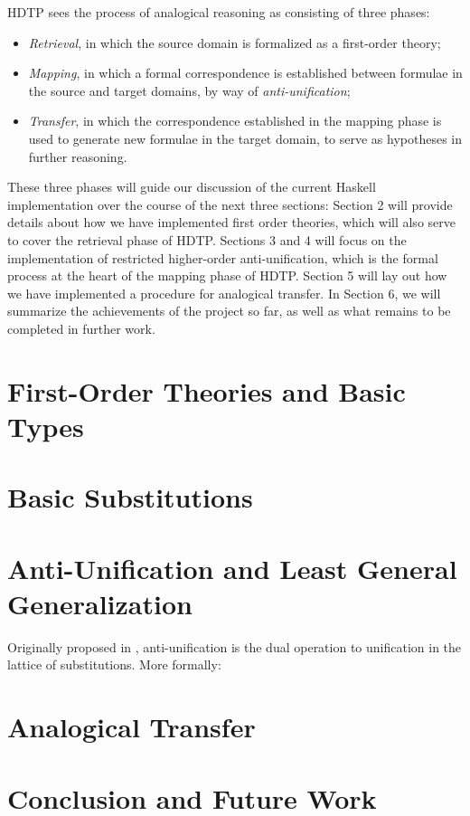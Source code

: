 \documentclass[12pt,a4paper]{article}
\begin{document}
HDTP sees the process of analogical reasoning as consisting of three phases: 
\begin{itemize}
    \item \textit{Retrieval}, in which the source domain is formalized as a first-order theory;
    \item \textit{Mapping}, in which a formal correspondence is established between formulae in the source and target domains, by way of \textit{anti-unification};
    \item \textit{Transfer}, in which the correspondence established in the mapping phase is used to generate new formulae in the target domain, to serve as hypotheses in further reasoning.
\end{itemize} 

These three phases will guide our discussion of the current Haskell implementation over the course of the next three sections: Section 2 will provide details about how we have implemented first order theories, which will also serve to cover the retrieval phase of HDTP. Sections 3 and 4 will focus on the implementation of restricted higher-order anti-unification, which is the formal process at the heart of the mapping phase of HDTP. Section 5 will lay out how we have implemented a procedure for analogical transfer. In Section 6, we will summarize the achievements of the project so far, as well as what remains to be completed in further work.
% 

\section{First-Order Theories and Basic Types}

% 

\section{Basic Substitutions}

% 

\section{Anti-Unification and Least General Generalization}
Originally proposed in \cite{Plotkin70}, anti-unification is the dual operation to unification in the lattice of substitutions. More formally:

\begin{definition}

\end{definition}
% 

\section{Analogical Transfer}

% 

\section{Conclusion and Future Work}
% 









\end{document}
